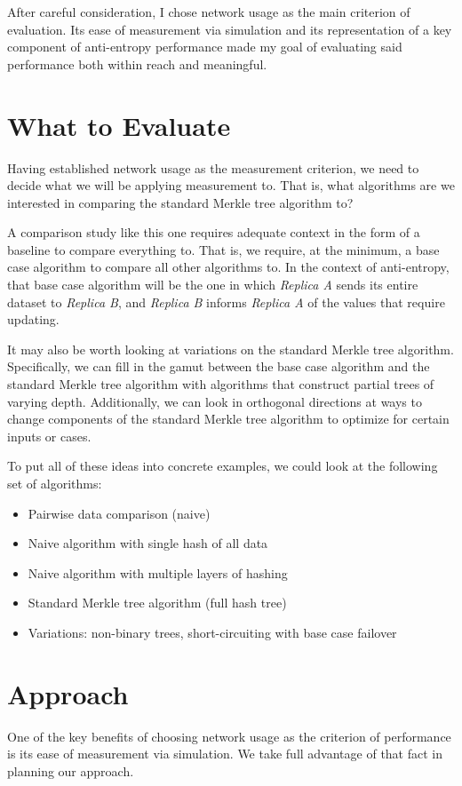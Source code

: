 \documentclass[11pt,letterpaper]{article}
\begin{document}
After careful consideration, I chose network usage as the main criterion of evaluation. Its ease of measurement via simulation and its representation of a key component of anti-entropy performance made my goal of evaluating said performance both within reach and meaningful.

\section{What to Evaluate}
Having established network usage as the measurement criterion, we need to decide what we will be applying measurement to. That is, what algorithms are we interested in comparing the standard Merkle tree algorithm to?

A comparison study like this one requires adequate context in the form of a baseline to compare everything to. That is, we require, at the minimum, a base case algorithm to compare all other algorithms to. In the context of anti-entropy, that base case algorithm will be the one in which \textit{Replica A} sends its entire dataset to \textit{Replica B}, and \textit{Replica B} informs \textit{Replica A} of the values that require updating.

It may also be worth looking at variations on the standard Merkle tree algorithm. Specifically, we can fill in the gamut between the base case algorithm and the standard Merkle tree algorithm with algorithms that construct partial trees of varying depth. Additionally, we can look in orthogonal directions at ways to change components of the standard Merkle tree algorithm to optimize for certain inputs or cases.

To put all of these ideas into concrete examples, we could look at the following set of algorithms:

\begin{itemize}
\item Pairwise data comparison (naive)
\item Naive algorithm with single hash of all data
\item Naive algorithm with multiple layers of hashing
\item Standard Merkle tree algorithm (full hash tree)
\item Variations: non-binary trees, short-circuiting with base case failover
\end{itemize}

\section{Approach}
One of the key benefits of choosing network usage as the criterion of performance is its ease of measurement via simulation. We take full advantage of that fact in planning our approach.
\end{document}
